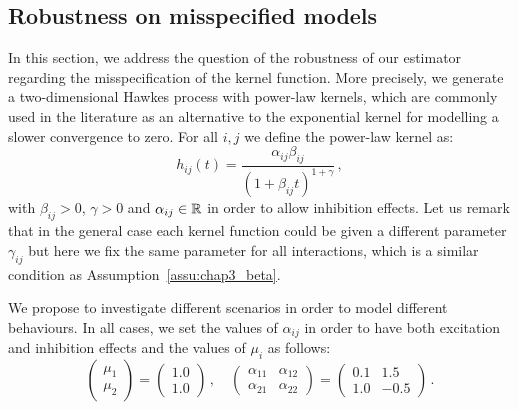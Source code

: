 \subsection{Robustness on misspecified models}
In this section, we address the question of the robustness of our estimator regarding the misspecification of the kernel function. More precisely, we generate a two-dimensional Hawkes process with power-law kernels, which are commonly used in the literature \parencite{Mishra2016, Ogata1988} as an alternative to the exponential kernel for modelling a slower convergence to zero. For all $i, j$ we define the power-law kernel as: \[h_{ij}(t) = \frac{\alpha_{ij}\beta_{ij}}{(1 + \beta_{ij}t)^{1 + \gamma}}\,,\] with $\beta_{ij} > 0$, $\gamma > 0$ and $\alpha_{ij}\in{\mathbb R}$ in order to allow inhibition effects. Let us remark that in the general case each kernel function could be given a different parameter $\gamma_{ij}$ but here we fix the same parameter for all interactions, which is a similar condition as Assumption~\ref{assu:chap3_beta}.

We propose to investigate different scenarios in order to model different behaviours. In all cases, we set the values of $\alpha_{ij}$ in order to have both excitation and inhibition effects and the values of $\mu_i$ as follows:
\[
 \begin{pmatrix}
  \mu_{1} \\
  \mu_{2} 
  \end{pmatrix} =
  \begin{pmatrix}
  1.0 \\ 
  1.0
  \end{pmatrix}\,,
  \quad
  \begin{pmatrix}
  \alpha_{11} & \alpha_{12}\\
  \alpha_{21} & \alpha_{22}
  \end{pmatrix}=
  \begin{pmatrix}
  0.1 & 1.5\\
  1.0 & -0.5
  \end{pmatrix}\,.
\]

